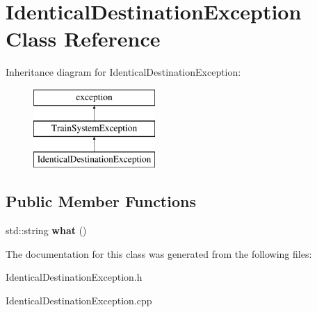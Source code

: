 \hypertarget{classIdenticalDestinationException}{}\section{Identical\+Destination\+Exception Class Reference}
\label{classIdenticalDestinationException}
Inheritance diagram for Identical\+Destination\+Exception\+:\begin{figure}[H]
\begin{center}
\leavevmode
\includegraphics[height=3.000000cm]{classIdenticalDestinationException}
\end{center}
\end{figure}
\subsection*{Public Member Functions}
\begin{DoxyCompactItemize}
\item 
\mbox{\label{classIdenticalDestinationException_a5d5caea19f96fa0bb14e9ae8b6a609ad}} 
std\+::string {\bfseries what} ()
\end{DoxyCompactItemize}


The documentation for this class was generated from the following files\+:\begin{DoxyCompactItemize}
\item 
Identical\+Destination\+Exception.\+h\item 
Identical\+Destination\+Exception.\+cpp\end{DoxyCompactItemize}
